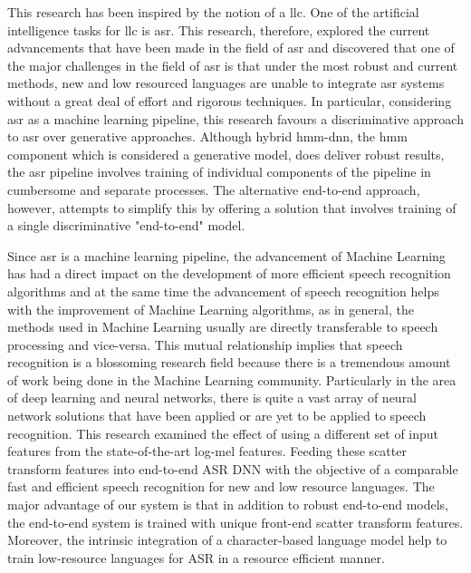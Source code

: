 This research has been inspired by the notion of a \acrfull{llc}.  One of the artificial intelligence tasks for \acrshort{llc} is \acrfull{asr}.  This research, therefore, explored the current advancements that have been made in the field of \acrshort{asr} and discovered that one of the major challenges in the field of \acrshort{asr} is that under the most robust and current methods, new and low resourced languages are unable to integrate \acrshort{asr} systems without a great deal of effort and rigorous techniques.  In particular, considering \acrshort{asr} as a machine learning pipeline, this research favours a discriminative approach to \acrshort{asr} over generative approaches.  Although hybrid \acrshort{hmm}-\acrshort{dnn}, the hmm component which is considered a generative model, does deliver robust results, the \acrshort{asr} pipeline involves training of individual components of the pipeline in cumbersome and separate processes.  The alternative end-to-end approach, however, attempts to simplify this by offering a solution that involves training of a single discriminative "end-to-end" model.


Since \acrshort{asr} is a machine learning pipeline,  the advancement of Machine Learning has had a direct impact on the development of more efficient speech recognition algorithms and at the same time the advancement of speech recognition helps with the improvement of Machine Learning algorithms, as in general, the methods used in Machine Learning usually are directly transferable to speech processing and vice-versa. This mutual relationship implies that speech recognition is a blossoming research field because there is a tremendous amount of work being done in the Machine Learning community. Particularly in the area of deep learning and neural networks, there is quite a vast array of neural network solutions that have been applied or are yet to be applied to speech recognition. This research examined the effect of using a different set of input features from the state-of-the-art log-mel features. Feeding these scatter transform features into end-to-end ASR DNN with the objective of a comparable fast and efficient speech recognition for new and low resource languages. The major advantage of our system is that in addition to robust end-to-end models, the end-to-end system is trained with unique front-end scatter transform features. Moreover, the intrinsic integration of a character-based language model help to train low-resource languages for ASR in a resource efficient manner. 

